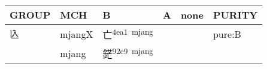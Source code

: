 \documentclass[14pt,a4paper]{scrartcl}
\begin{document}
\begin{longtable}[c]{@{}llllll@{}}
\toprule
\begin{minipage}[b]{0.14\columnwidth}\raggedright\strut
GROUP
\strut\end{minipage} &
\begin{minipage}[b]{0.14\columnwidth}\raggedright\strut
MCH
\strut\end{minipage} &
\begin{minipage}[b]{0.14\columnwidth}\raggedright\strut
B
\strut\end{minipage} &
\begin{minipage}[b]{0.14\columnwidth}\raggedright\strut
A
\strut\end{minipage} &
\begin{minipage}[b]{0.14\columnwidth}\raggedright\strut
none
\strut\end{minipage} &
\begin{minipage}[b]{0.14\columnwidth}\raggedright\strut
PURITY
\strut\end{minipage}\tabularnewline
\midrule
\endhead
\begin{minipage}[t]{0.14\columnwidth}\raggedright\strut
兦
\strut\end{minipage} &
\begin{minipage}[t]{0.14\columnwidth}\raggedright\strut
mjangX
\strut\end{minipage} &
\begin{minipage}[t]{0.14\columnwidth}\raggedright\strut
亡\textsuperscript{4ea1~mjang}
\strut\end{minipage} &
\begin{minipage}[t]{0.14\columnwidth}\raggedright\strut
\strut\end{minipage} &
\begin{minipage}[t]{0.14\columnwidth}\raggedright\strut
\strut\end{minipage} &
\begin{minipage}[t]{0.14\columnwidth}\raggedright\strut
pure:B
\strut\end{minipage}\tabularnewline
\begin{minipage}[t]{0.14\columnwidth}\raggedright\strut
𦬆
\strut\end{minipage} &
\begin{minipage}[t]{0.14\columnwidth}\raggedright\strut
mjang
\strut\end{minipage} &
\begin{minipage}[t]{0.14\columnwidth}\raggedright\strut
鋩\textsuperscript{92e9~mjang}
\strut\end{minipage} &

\end{longtable}
\end{document}
